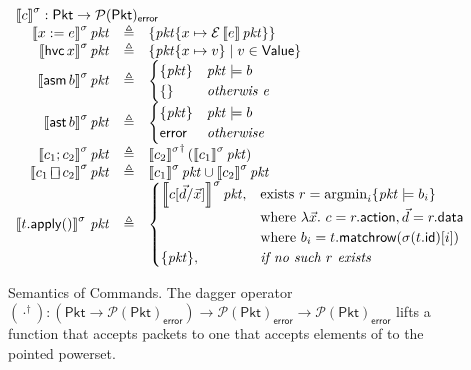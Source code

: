 \documentclass{article}
\newcommand{\pkt}{\mathit{pkt}}
\newcommand{\error}{\mathsf{error}}
\newcommand{\denote}[1]{\left\llbracket#1\right\rrbracket}
\newcommand{\edenote}[1]{\mathcal{E}\denote{#1}}
\newcommand{\Value}{\mathsf{Value}}
\newcommand{\Pkt}{\mathsf{Pkt}}
\newcommand{\Row}{\mathsf{Row}}
\newcommand{\action}{\mathsf{action}}
\newcommand{\data}{\mathsf{data}}
\newcommand{\id}{\mathsf{id}}
\newcommand{\assert}{\mathop{\mathsf{ast}}}
\newcommand{\assume}{\mathop{\mathsf{asm}}}
\newcommand{\apply}{\mathsf{apply}}
\newcommand{\choiceop}{\rotatebox[origin=c]{90}{$\sqsubset\!\!\!\sqsupset$}}
\newcommand{\choice}{\mathbin{\choiceop}}
\newcommand{\havoc}[1]{\mathop{\mathsf{hvc}}#1}
\newcommand{\argmin}{\mathop{\textrm{argmin}}}
\newcommand{\matchrow}{\mathsf{matchrow}}
\theoremstyle{plain}
\theoremstyle{definition}
\theoremstyle{remark}
\begin{document}
\begin{figure}[htp]
  \[\begin{array}{r >{\triangleq}cl}
  \multicolumn{3}{l}{\denote{c}^\sigma : \Pkt \to \mathcal{P}(\Pkt)_\error }\\
  \denote{x := e}^\sigma\pkt && \{\pkt\{x \mapsto \edenote{e}\pkt\}\} \\
  \denote{\havoc x}^\sigma\pkt && \{ \pkt\{x \mapsto v\} \mid v \in \Value \} \\
    \denote{\assume b}^\sigma\pkt &&
    \begin{cases}
      \{\pkt\} & \pkt \models b \\
      \{\} & \textit{otherwis
e} \\
    \end{cases}\\
    \denote{\assert b}^\sigma\pkt &&
    \begin{cases}
      \{\pkt\} & \pkt \models b \\
      \error & \textit{otherwise}
    \end{cases} \\
    \denote{c_1;c_2}^\sigma\pkt&&
    {\denote{c_2}^\sigma}^\dagger\left(\denote{c_1}^\sigma\pkt\right)\\
    \denote{c_1 \choice c_2}^\sigma\pkt &&
    \denote{c_1}^\sigma\pkt \cup \denote{c_2}^\sigma\pkt \\
    \denote{t.\apply()}^\sigma\,\pkt &&
    \begin{cases}
      \denote{c[\vec d/\vec x]}^\sigma\pkt,
      & \text{exists}~r = \argmin_i\{\pkt \models b_i\} \\
      & \text{where}~\lambda \vec x.~c = r.\action, \vec d = r.\data \\
      & \text{where}~b_i = t.\matchrow(\sigma(t.\id)[i]) \\
      \{\pkt\}, & \textit{if no such } r \textit{ exists}
    \end{cases}
  \end{array}\]
  \caption{Semantics of Commands. The dagger operator $(\cdot^\dagger) : (\Pkt \to
    \mathcal{P}(\Pkt)_\error) \to \mathcal{P}(\Pkt)_\error \to
    \mathcal{P}(\Pkt)_\error$ lifts a function that accepts packets to one that
    accepts elements of to the pointed powerset.}
  \label{fig:com-sem}
\end{figure}
\end{document}
